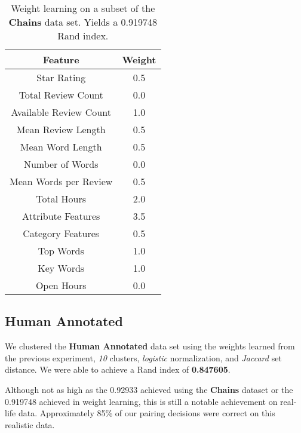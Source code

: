 \documentclass{article}
\begin{document}
      \begin{table}
         \begin{center}
            \begin{tabular}{| c | c |}
               \hline
                  Feature & Weight \\
               \hline
                  Star Rating & 0.5 \\
                  Total Review Count & 0.0 \\
                  Available Review Count & 1.0 \\
                  Mean Review Length & 0.5 \\
                  Mean Word Length & 0.5 \\
                  Number of Words & 0.0 \\
                  Mean Words per Review & 0.5 \\
                  Total Hours & 2.0 \\
                  Attribute Features & 3.5 \\
                  Category Features & 0.5 \\
                  Top Words & 1.0 \\
                  Key Words & 1.0 \\
                  Open Hours & 0.0 \\
               \hline
            \end{tabular}
            \caption{Weight learning on a subset of the \textbf{Chains} data set. Yields a 0.919748 Rand index.}
            \label{tab:weight-learning}
         \end{center}
      \end{table}

   \subsection{Human Annotated}
      We clustered the \textbf{Human Annotated} data set using the weights learned from the previous experiment, \textit{10} clusters, \textit{logistic} normalization, and \textit{Jaccard} set distance.
      We were able to achieve a Rand index of \textbf{0.847605}.

      Although not as high as the 0.92933 achieved using the \textbf{Chains} dataset or the 0.919748 achieved in weight learning, this is still a notable achievement on real-life data.
      Approximately 85\% of our pairing decisions were correct on this realistic data.
\end{document}
